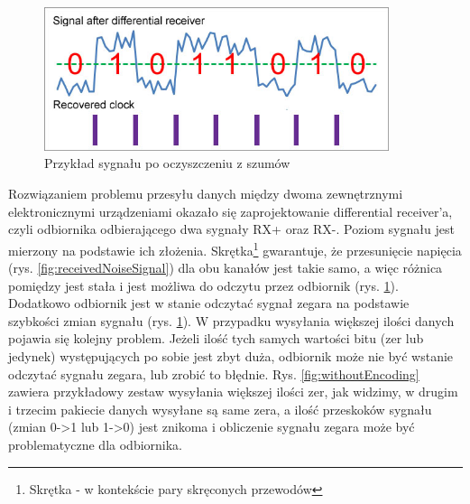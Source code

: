\documentclass{BscUS}
\begin{document}
\begin{figure}[H]
\centering
\includegraphics[width=0.9\textwidth]{./img/receivedCleanedSignal}
\caption{Przykład sygnału po oczyszczeniu z szumów \cite{receivedCleanedSignal}}
\label{fig:receivedCleanedSignal}
\end{figure}
\noindent Rozwiązaniem problemu przesyłu danych między dwoma zewnętrznymi elektronicznymi urządzeniami okazało się zaprojektowanie differential receiver'a, czyli odbiornika odbierającego dwa sygnały RX+ oraz RX-. Poziom sygnału jest mierzony na podstawie ich złożenia. Skrętka\footnote{Skrętka - w kontekście pary skręconych przewodów} gwarantuje, że przesunięcie napięcia (rys. \ref{fig:receivedNoiseSignal}) dla obu kanałów jest takie samo, a więc różnica pomiędzy jest stała i jest możliwa do odczytu przez odbiornik (rys. \ref{fig:receivedCleanedSignal}). Dodatkowo odbiornik jest w stanie odczytać sygnał zegara na podstawie szybkości zmian sygnału (rys. \ref{fig:receivedCleanedSignal}).
\newline
\indent W przypadku wysyłania większej ilości danych pojawia się kolejny problem. Jeżeli ilość tych samych wartości bitu (zer lub jedynek) występujących po sobie jest zbyt duża, odbiornik może nie być wstanie odczytać sygnału zegara, lub zrobić to błędnie. Rys. \ref{fig:withoutEncoding} zawiera przykładowy zestaw wysyłania większej ilości zer, jak widzimy, w drugim i trzecim pakiecie danych wysyłane są same zera, a ilość przeskoków sygnału (zmian 0->1 lub 1->0) jest znikoma i obliczenie sygnału zegara może być problematyczne dla odbiornika.
\end{document}
